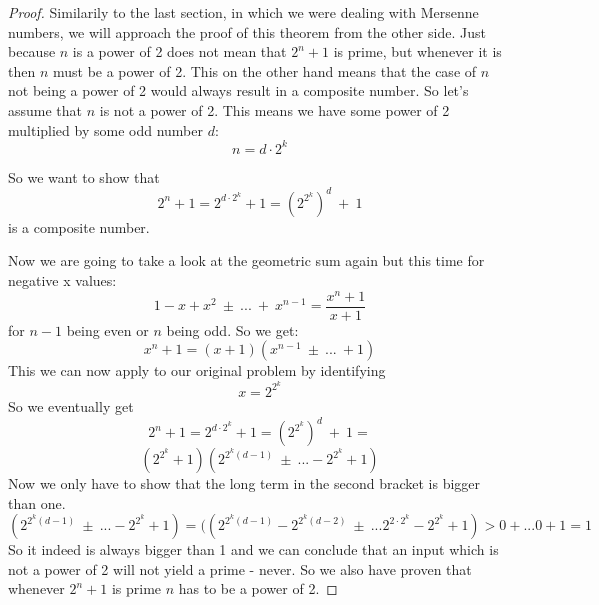 \documentclass{article}
\theoremstyle{definition}
\begin{document}
\begin{proof}
    Similarily to the last section, in which we were dealing with Mersenne numbers, we will approach the proof of this theorem from the other side. Just because $n$ is a power of 2 does not mean that $2^n + 1$ is prime, but whenever it is then $n$ must be a power of 2. This on the other hand means that the case of $n$ not being a power of 2 would always result in a composite number. So let's assume that $n$ is not a power of 2. This means we have some power of 2 multiplied by some odd number $d$:
    \begin{equation}
        n = d\cdot 2^k
    \end{equation}

    So we want to show that
    \begin{equation}
        2^n + 1 = 2^{d\cdot 2^k} + 1 = (2^{2^k})^d \: + \: 1
    \end{equation}
    is a composite number.

    Now we are going to take a look at the geometric sum again but this time for negative x values:
    \begin{equation}
        1 - x + x^2 \: \pm  \:...\: + \: x^{n-1} = \frac{x^n+1}{x+1}
    \end{equation}
    for $n-1$ being even or $n$ being odd.
    So we get:
    \begin{equation}
        x^n +1 = (x+1)(x^{n-1} \: \pm \: ... \: +1)
    \end{equation}
    This we can now apply to our original problem by identifying 
    \begin{equation}
        x = 2^{2^k}
    \end{equation}
    So we eventually get
    \begin{equation}
        2^n + 1 = 2^{d\cdot 2^k} + 1 = (2^{2^k})^d \: + \: 1 = 
    \end{equation}
    \begin{equation}
        (2^{2^k}+1)(2^{2^k(d-1)} \: \pm \: ... -2^{2^k}+1)
    \end{equation}
    Now we only have to show that the long term in the second bracket is bigger than one.
    \begin{equation}
        (2^{2^k(d-1)} \: \pm \: ... -2^{2^k}+1) = ((2^{2^k(d-1)}-2^{2^k(d-2)} \: \pm \: ... 2^{2\cdot 2^k}-2^{2^k}+1) > 0 + ... 0 + 1 = 1
    \end{equation}
    So it indeed is always bigger than 1 and we can conclude that an input which is not a power of 2 will not yield a prime - never. So we also have proven that whenever $2^n+1$ is prime $n$ has to be a power of 2.
\end{proof}
\end{document}
